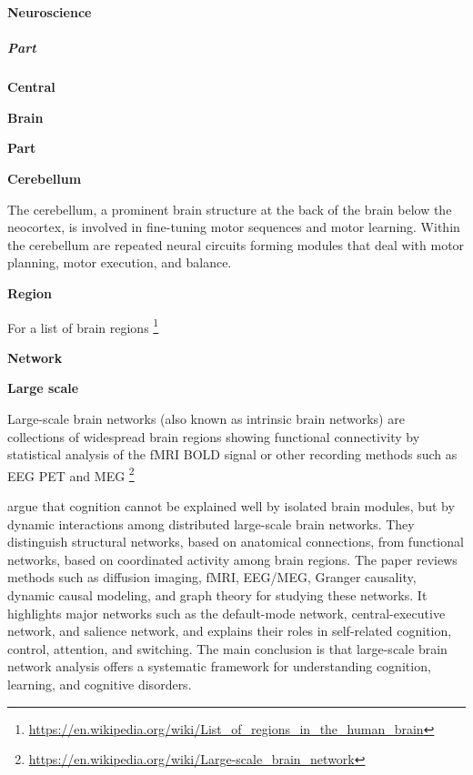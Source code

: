 \documentclass{book}
\providecommand{\ProjectDeepHeading}[2]{%
    \par\medskip\noindent\textbf{#2}\par\smallskip
}
\providecommand{\ProjectSafeIncludePdf}[2][]{}
\providecommand{\seeherefooter}[1]{\footnote{\url{#1}}}
\begin{document}
\ProjectDeepHeading{2}{Neuroscience}
    
\ProjectSafeIncludePdf[pages=-]{../assets/review/biology/neuroscience.pdf}

\subparagraph{Part}

\ProjectDeepHeading{1}{Central}

\ProjectDeepHeading{2}{Brain}

\ProjectDeepHeading{3}{Part}

\ProjectDeepHeading{4}{Cerebellum}


The cerebellum, a prominent brain structure at the back of the brain below
    the neocortex, is involved in fine-tuning motor sequences and motor learning.
    Within the cerebellum are repeated neural circuits forming modules that deal
    with motor planning, motor execution, and balance.

\ProjectDeepHeading{3}{Region}


For a list of brain regions \seeherefooter{https://en.wikipedia.org/wiki/List_of_regions_in_the_human_brain}

\ProjectDeepHeading{4}{Network}

\ProjectDeepHeading{5}{Large scale}


Large-scale brain networks (also known as intrinsic brain networks) are collections of widespread brain regions showing functional connectivity by statistical analysis of the fMRI BOLD signal or other recording methods such as EEG PET and MEG \seeherefooter{https://en.wikipedia.org/wiki/Large-scale_brain_network}
    
    \cite{bressler-2010-large-scale-brain-networks-in-cognition-emerging-methods-and-principles} argue that cognition cannot be explained well by isolated brain modules, but by dynamic interactions among distributed large-scale brain networks. They distinguish structural networks, based on anatomical connections, from functional networks, based on coordinated activity among brain regions. The paper reviews methods such as diffusion imaging, fMRI, EEG/MEG, Granger causality, dynamic causal modeling, and graph theory for studying these networks. It highlights major networks such as the default-mode network, central-executive network, and salience network, and explains their roles in self-related cognition, control, attention, and switching. The main conclusion is that large-scale brain network analysis offers a systematic framework for understanding cognition, learning, and cognitive disorders.
\end{document}
